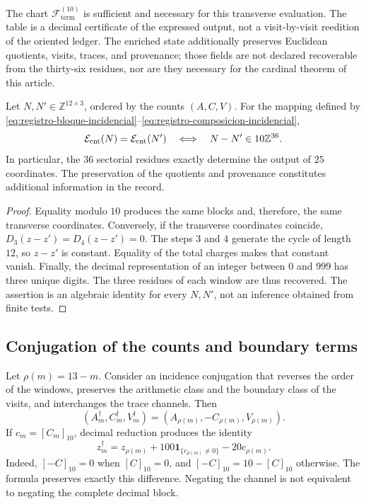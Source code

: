 The chart \(\mathscr F_{\mathrm{term}}^{(10)}\) is sufficient and necessary
for this transverse evaluation. The table is a decimal certificate of the
expressed output, not a visit-by-visit reedition of the oriented ledger. The
enriched state additionally preserves Euclidean quotients, visits, traces,
and provenance; those fields are not declared recoverable from the thirty-six
residues, nor are they necessary for the cardinal theorem of this article.

\begin{proposition}
\label{prop:registro-36-residuos}
Let \(N,N'\in\mathbb Z^{12\times3}\), ordered by the counts
\((A,C,V)\). For the mapping defined by
\eqref{eq:registro-bloque-incidencial}--\eqref{eq:registro-composicion-incidencial},
\[
 \mathcal E_{\rm cnt}(N)=\mathcal E_{\rm cnt}(N')
 \quad\Longleftrightarrow\quad
 N-N'\in10\mathbb Z^{36}.
\]
In particular, the \(36\) sectorial residues exactly determine the output of
\(25\) coordinates. The preservation of the quotients and provenance
constitutes additional information in the record.
\end{proposition}

\begin{proof}
Equality modulo \(10\) produces the same blocks and, therefore, the same
transverse coordinates. Conversely, if the transverse coordinates coincide,
\(D_3(z-z')=D_4(z-z')=0\). The steps \(3\) and \(4\) generate the cycle of
length \(12\), so \(z-z'\) is constant. Equality of the total charges makes
that constant vanish. Finally, the decimal representation of an integer
between \(0\) and \(999\) has three unique digits. The three residues of each
window are thus recovered. The assertion is an algebraic identity for every
\(N,N'\), not an inference obtained from finite tests.
\end{proof}

\subsection{Conjugation of the counts and boundary terms}
\label{subsec:registro-conjugacion-incidencial}

Let \(\rho(m)=13-m\). Consider an incidence conjugation that reverses the
order of the windows, preserves the arithmetic class and the boundary class
of the visits, and interchanges the trace channels. Then
\[
 (A_m^\dagger,C_m^\dagger,V_m^\dagger)
 =(A_{\rho(m)},-C_{\rho(m)},V_{\rho(m)}).
\]
If \(c_m=[C_m]_{10}\), decimal reduction produces the identity
\begin{equation}
 z_m^\dagger=z_{\rho(m)}
       +100\mathbf1_{\{c_{\rho(m)}\ne0\}}-20c_{\rho(m)}.
 \label{eq:registro-conjugacion-decimal}
\end{equation}
Indeed, \([-C]_{10}=0\) when \([C]_{10}=0\), and
\([-C]_{10}=10-[C]_{10}\) otherwise. The formula preserves exactly this
difference. Negating the channel is not equivalent to negating the complete
decimal block.

